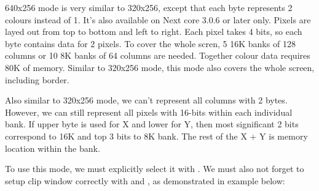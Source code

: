 \documentclass[12pt,twoside,openright,a4paper]{book}
\begin{document}
640x256 mode is very similar to 320x256, except that each byte represents 2 colours instead of 1. It's also available on Next core 3.0.6 or later only. Pixels are layed out from top to bottom and left to right. Each pixel takes 4 bits, so each byte contains data for 2 pixels. To cover the whole scren, 5 16K banks of 128 columns or 10 8K banks of 64 columns are needed. Together colour data requires 80K of memory. Similar to 320x256 mode, this mode also covers the whole screen, including border.

Also similar to 320x256 mode, we can't represent all columns with 2 bytes. However, we can still represent all pixels with 16-bits within each individual bank. If upper byte is used for X and lower for Y, then most significant 2 bits correspond to 16K and top 3 bits to 8K bank. The rest of the X + Y is memory location within the bank.

To use this mode, we must explicitly select it with . We must also not forget to setup clip window correctly with  and , as demonstrated in example below:
\end{document}
